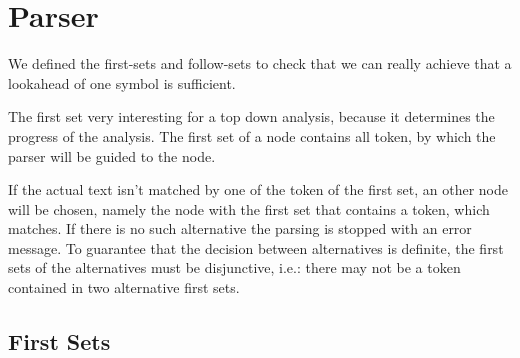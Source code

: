 \section{Parser}

We defined the first-sets and follow-sets to check that we can really achieve that a lookahead of one symbol is sufficient.

The first set very interesting for a top down analysis, because it determines the progress of the analysis.
The first set of a node contains all token, by which the parser will be guided to the node.

If the actual text isn't matched by one of the token of the first set, an other node will be chosen, namely the node with the first set that contains a token, which matches. If there is no such alternative the parsing is stopped with an error message. To guarantee that the decision between alternatives is definite, the first sets of the alternatives must be disjunctive, i.e.: there may not be a token contained in two alternative first sets. 


\subsection{First Sets}

